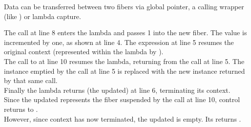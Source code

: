 
Data can be transferred between two fibers via global pointer, a calling
wrapper (like ) or lambda capture.

The \resume call at line 8 enters the lambda and passes 1 into the
new fiber. The value is incremented by one, as shown at line 4. The expression
 at line 5 resumes the original context (represented
within the lambda by ).\\
The call to  at line 10 resumes the lambda, returning from
the  call at line 5. The \fiber instance 
emptied by the \resume call at line 5 is replaced with the new instance
returned by that same \resume call.\\
Finally the lambda returns (the updated)  at line 6, terminating its
context.\\

Since the updated  represents the fiber suspended by the call at
line 10, control returns to \main.\\

However, since context  has now terminated, the updated 
is empty. Its \opbool returns .\\

